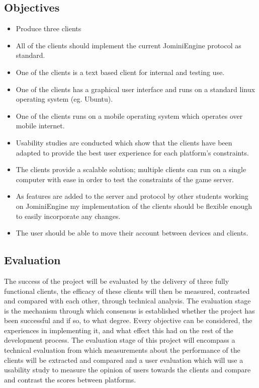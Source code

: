 \documentclass{article}
\begin{document}
	\subsection{Objectives}
	\begin{itemize}
	\item Produce three clients
	\item All of the clients should implement the current JominiEngine protocol as standard.
	\item One of the clients is a text based client for internal and testing use.
	\item One of the clients has a graphical user interface and runs on a standard linux operating system (eg. Ubuntu).
	\item One of the clients runs on a mobile operating system which operates over mobile internet.
	\item Usability studies are conducted which show that the clients have been adapted to provide the best user experience for each platform’s constraints.
	\item The clients provide a scalable solution; multiple clients can run on a single computer with ease in order to test the constraints of the game server.
	\item As features are added to the server and protocol by other students working on JominiEngine my implementation of the clients should be flexible enough to easily incorporate any changes.
	\item The user should be able to move their account between devices and clients.
\end{itemize}
	\subsection{Evaluation}
	The success of the project will be evaluated by the delivery of three fully functional clients, the efficacy of these clients will then be measured, contrasted and compared with each other, through technical analysis. The evaluation stage is the mechanism through which consensus is established whether the project has been successful and if so, to what degree. Every objective can be considered, the experiences in implementing it, and what effect this had on the rest of the development process. The evaluation stage of this project will encompass a technical evaluation from which measurements about the performance of the clients will be extracted and compared and a user evaluation which will use a usability study to measure the opinion of users towards the clients and compare and contrast the scores between platforms. 
\end{document}
